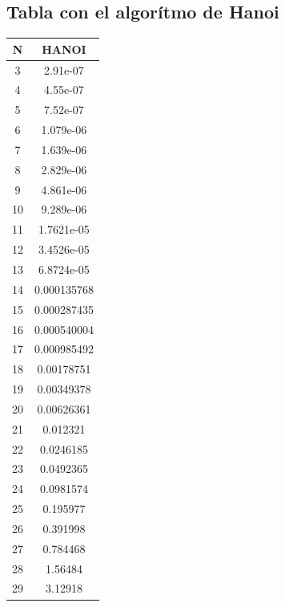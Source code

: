 \documentclass[11pt,spanish]{article} %
\begin{document}
\subsection{Tabla con el algor\'itmo de Hanoi}
\begin{center}
\begin{tabular}{|c|c|}
\hline
N  & HANOI       \\ \hline
3  & 2.91e-07    \\ \hline
4  & 4.55e-07    \\ \hline
5  & 7.52e-07    \\ \hline
6  & 1.079e-06   \\ \hline
7  & 1.639e-06   \\ \hline
8  & 2.829e-06   \\ \hline
9  & 4.861e-06   \\ \hline
10 & 9.289e-06   \\ \hline
11 & 1.7621e-05  \\ \hline
12 & 3.4526e-05  \\ \hline
13 & 6.8724e-05  \\ \hline
14 & 0.000135768 \\ \hline
15 & 0.000287435 \\ \hline
16 & 0.000540004 \\ \hline
17 & 0.000985492 \\ \hline
18 & 0.00178751  \\ \hline
19 & 0.00349378  \\ \hline
20 & 0.00626361  \\ \hline
21 & 0.012321    \\ \hline
22 & 0.0246185   \\ \hline
23 & 0.0492365   \\ \hline
24 & 0.0981574   \\ \hline
25 & 0.195977    \\ \hline
26 & 0.391998    \\ \hline
27 & 0.784468    \\ \hline
28 & 1.56484     \\ \hline
29 & 3.12918     \\ \hline
\end{tabular}
\end{center}
\end{document}
